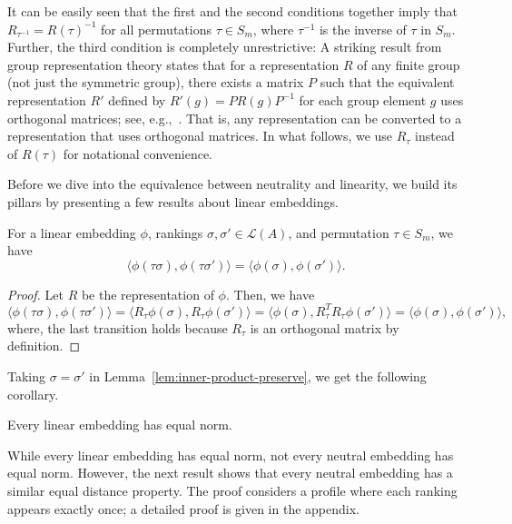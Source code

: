 \documentclass[prodmode,acmec]{ec-acmsmall}
\newcommand{\calL}{{\mathcal{L}}}
\newcommand{\rank}{{\calL(A)}}
\begin{document}
\noindent
It can be easily seen that the first and the second conditions together imply that $R_{\tau^{-1}} = R(\tau)^{-1}$ for all permutations $\tau \in S_m$, where $\tau^{-1}$ is the inverse of $\tau$ in $S_m$. Further, the third condition is completely unrestrictive: A striking result from group representation theory states that for a representation $R$ of any finite group (not just the symmetric group), there exists a matrix $P$ such that the equivalent representation $R'$ defined by $R'(g) = P R(g) P^{-1}$ for each group element $g$ uses orthogonal matrices; see, e.g.,~\cite[Thm~6.3]{BMWM63}. That is, any representation can be converted to a representation that uses orthogonal matrices. In what follows, we use $R_{\tau}$ instead of $R(\tau)$ for notational convenience. 

Before we dive into the equivalence between neutrality and linearity, we build its pillars by presenting a few results about linear embeddings. 
\begin{lemma}
For a linear embedding $\phi$, rankings $\sigma,\sigma' \in \rank$, and permutation $\tau \in S_m$, we have
$$
\langle \phi(\tau \sigma), \phi(\tau \sigma') \rangle = \langle \phi(\sigma), \phi(\sigma') \rangle.
$$
\label{lem:inner-product-preserve}
\end{lemma}
\begin{proof}
Let $R$ be the representation of $\phi$. Then, we have 
\begin{equation}
\langle \phi(\tau \sigma), \phi(\tau \sigma') \rangle = \langle R_{\tau}\phi(\sigma), R_{\tau}\phi(\sigma') \rangle = \langle \phi(\sigma), R_{\tau}^T R_{\tau}\phi(\sigma') \rangle = \langle \phi(\sigma), \phi(\sigma') \rangle,
\label{eqn:linear-inner-product}
\end{equation}
where, the last transition holds because $R_{\tau}$ is an orthogonal matrix by definition. 
\end{proof}
%
Taking $\sigma = \sigma'$ in Lemma~\ref{lem:inner-product-preserve}, we get the following corollary.
%
\begin{corollary}
Every linear embedding has equal norm.
\label{cor:linear-equal-norm}
\end{corollary}
%
While every linear embedding has equal norm, not every neutral embedding has equal norm. However, the next result shows that every neutral embedding has a similar equal distance property. The proof considers a profile where each ranking appears exactly once; a detailed proof is given in the appendix.
\end{document}
